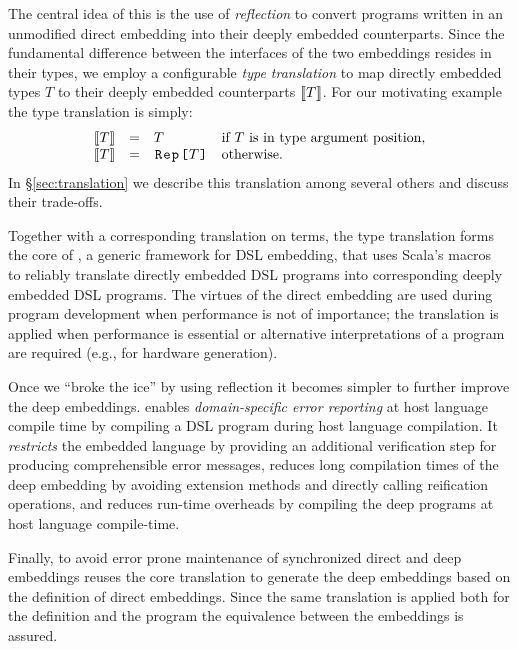 The central idea of this \work is the use of \emph{reflection} to convert
programs written in an unmodified direct embedding into their deeply
embedded counterparts.  Since the fundamental difference between the
interfaces of the two embeddings resides in their types, we employ a
configurable \emph{type translation} to map directly embedded
types $T$ to their deeply embedded counterparts $\llbracket T \rrbracket$. For our
motivating example the type translation is simply:
\[
\begin{array}{llll}
  \ttrone{T} &=& T   & \text{if $T$ is in type argument position,}  \\
  \ttrone{T} &=& \text{\code{Rep[}}T\text{\code{]}}& \text{otherwise}.
\end{array}
\]
In \S \ref{sec:translation} we describe this translation among several
others and discuss their trade-offs.

Together with a corresponding translation on terms, the type
translation forms the core of \yy, a generic framework for DSL
embedding, that uses Scala's macros~\cite{burmako_scala_2013} to
reliably translate directly embedded DSL programs into corresponding
deeply embedded DSL programs.  The virtues of the direct embedding are
used during program development when performance is not of importance;
the translation is applied when performance is essential or
alternative interpretations of a program are required (e.g., for
hardware generation).

Once we ``broke the ice'' by using reflection it becomes simpler to further
 improve the deep embeddings. \yy enables \emph{domain-specific error reporting} at host language compile time
 by compiling a DSL program during host language compilation. It \emph{restricts} the embedded language by
 providing an additional verification step for producing comprehensible error messages,
 reduces long compilation times of the deep embedding by avoiding extension methods and
 directly calling reification operations, and reduces run-time overheads by compiling the
 deep programs at host language compile-time.

Finally, to avoid error prone maintenance of synchronized direct and deep embeddings \yy reuses the core
translation to generate the deep embeddings based on the definition of
direct embeddings. Since the same translation is applied both for the
\edsl definition and the \edsl program the equivalence between the
embeddings is assured.

